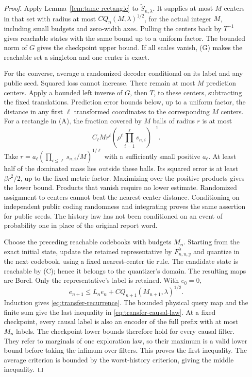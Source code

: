 \documentclass[11pt]{amsart}
\theoremstyle{definition}\newtheorem{definition}[theorem]{Definition}
\theoremstyle{remark}\newtheorem{remark}[theorem]{Remark}
\begin{document}
\begin{proof}
Apply Lemma~\ref{lem:tame-rectangle} to $\widetilde S_{n,\lambda}$.
It supplies at most $M$ centers in that set with radius at most
$C Q_n(M,\lambda)^{1/2}$, for the actual integer $M$, including
small budgets and zero-width axes. Pulling the centers back by $T^{-1}$
gives reachable states with the same bound up to a uniform factor.
The bounded norm of $G$ gives the checkpoint upper bound. If all scales
vanish, (G) makes the reachable set a singleton and one center is exact.

For the converse, average a randomized decoder conditional on its label
and any public seed. Squared loss cannot increase. There remain at most
$M$ prediction centers. Apply a bounded left inverse of $G$, then $T$,
to these centers, subtracting the fixed translations. Prediction error
bounds below, up to a uniform factor, the distance in any first
$\ell$ transformed coordinates to the corresponding $M$ centers.
For a rectangle in (A), the fraction covered by $M$ balls of radius $r$
is at most
\[
 C_\ell M r^\ell\left(\rho^\ell
                              \prod_{i=1}^{\ell}s_{n,i}\right)^{-1}.
\]
Take $r=a_\ell(\prod_{i\le\ell}s_{n,i}/M)^{1/\ell}$ with a
sufficiently small positive $a_\ell$. At least half of the dominated
mass lies outside these balls. Its squared error is at least
$\beta r^2/2$, up to the fixed metric factor. Maximizing over the
positive products gives the lower bound. Products that vanish require
no lower estimate. Randomized assignment to centers cannot beat the
nearest-center distance. Conditioning on independent public coding
randomness and integrating proves the same assertion for public seeds.
The history law has not been conditioned on an event of probability one
in place of the original report word.

Choose the preceding reachable codebooks with budgets $M_n$.
Starting from the exact initial state, update the retained representative
by $F_{n,u,y}^{\lambda}$ and quantize in the next codebook, using a
fixed nearest-center tie rule. The candidate state is reachable by (C);
hence it belongs to the quantizer's domain. The resulting maps are
Borel. Only the representative's label is retained. With $e_0=0$,
\[
 e_{n+1}\le L_n e_n+C Q_{n+1}(M_{n+1},\lambda)^{1/2}.
\]
Induction gives \eqref{eq:transfer-recurrence}. The bounded physical
query map and the finite sum give the last inequality in
\eqref{eq:transfer-causal-law}. At a fixed checkpoint, every causal
label is also an encoder of the full prefix with at most $M_n$ labels.
The checkpoint lower bounds therefore hold for every causal filter.
They refer to marginals of one exploration law, so their maximum is a
valid lower bound before taking the infimum over filters. This proves
the first inequality. The average criterion is bounded by the
worst-history criterion, giving the middle inequality.
\end{proof}
\end{document}
